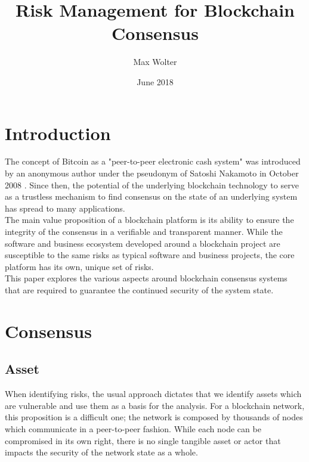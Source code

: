 \documentclass[11pt,a4paper,draft]{article}
\title{Risk Management for Blockchain Consensus}
\author{Max Wolter}
\date{June 2018}
\begin{document}
\maketitle
\begin{abstract}
\end{abstract}
\newpage

\tableofcontents
\newpage

\section{Introduction}

The concept of Bitcoin as a "peer-to-peer electronic cash system" was introduced by an anonymous author under the pseudonym of Satoshi Nakamoto in October 2008 \cite{bitcoin}. Since then, the potential of the underlying blockchain technology to serve as a trustless mechanism to find consensus on the state of an underlying system has spread to many applications.\\

The main value proposition of a blockchain platform is its ability to ensure the integrity of the consensus in a verifiable and transparent manner. While the software and business ecosystem developed around a blockchain project are susceptible to the same risks as typical software and business projects, the core platform has its own, unique set of risks.\\

This paper explores the various aspects around blockchain consensus systems that are required to guarantee the continued security of the system state.\\

\section{Consensus}

\subsection{Asset}

When identifying risks, the usual approach dictates that we identify assets which are vulnerable and use them as a basis for the analysis. For a blockchain network, this proposition is a difficult one; the network is composed by thousands of nodes which communicate in a peer-to-peer fashion. While each node can be compromised in its own right, there is no single tangible asset or actor that impacts the security of the network state as a whole.\\
\end{document}
